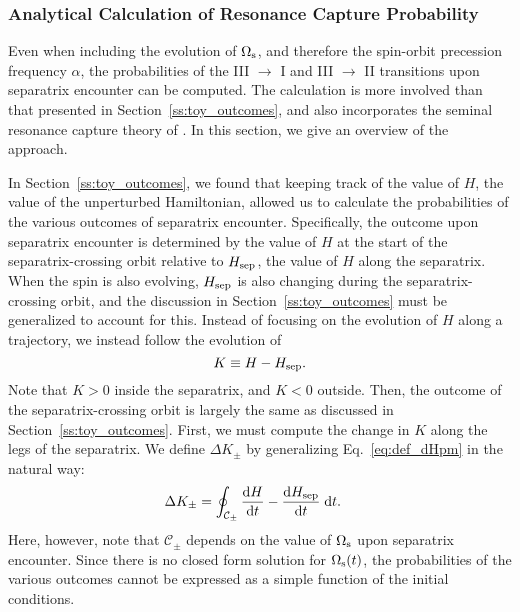 \documentclass[
        fleqn,
        usenatbib,
    ]{mnras}
\newcommand*{\rd}[2]{\frac{\mathrm{d}#1}{\mathrm{d}#2}}
\begin{document}
\subsubsection{Analytical Calculation of Resonance Capture Probability
}\label{ss:phop_weaktide}

Even when including the evolution of $\Omega_{\rm s}$, and therefore the
spin-orbit precession frequency $\alpha$, the probabilities of the III $\to$ I
and III $\to$ II transitions upon separatrix encounter can be computed. The
calculation is more involved than that presented in
Section~\ref{ss:toy_outcomes}, and also incorporates the seminal resonance
capture theory of \citet{henrard1982}. In this section, we give an
overview of the approach.

In Section~\ref{ss:toy_outcomes}, we found that keeping track of the value of
$H$, the value of the
unperturbed Hamiltonian, allowed us to calculate the probabilities of the
various outcomes of separatrix encounter. Specifically, the outcome upon separatrix
encounter is determined by the value of $H$ at the start of the
separatrix-crossing orbit relative to $H_{\rm sep}$, the value of $H$ along the
separatrix. When the spin is also evolving, $H_{\rm sep}$ is also
changing during the separatrix-crossing orbit, and the discussion in
Section~\ref{ss:toy_outcomes} must be generalized to account for this. Instead
of focusing on the evolution of $H$ along a trajectory, we instead follow the
evolution of
\begin{equation}
    K \equiv H - H_{\rm sep}.
\end{equation}
Note that $K > 0$ inside the separatrix, and $K < 0$ outside. Then, the outcome
of the separatrix-crossing orbit is largely the same as discussed in
Section~\ref{ss:toy_outcomes}. First, we must compute the change in $K$ along
the legs of the separatrix. We define $\Delta K_{\pm}$ by generalizing
Eq.~\eqref{eq:def_dHpm} in the natural way:
\begin{align}
    \Delta K_{\pm} &= \oint_{\mathcal{C}_{\pm}} \rd{H}{t}
        - \rd{H_{\rm sep}}{t}\;\mathrm{d}t.\label{eq:def_dK_weaktide}
\end{align}
Here, however, note that $\mathcal{C}_{\pm}$ depends on the value of
$\Omega_{\rm s}$ upon separatrix encounter. Since there is no closed form
solution for $\Omega_{\rm s}(t)$, the probabilities of the various outcomes
cannot be expressed as a simple function of the initial conditions.
\end{document}
